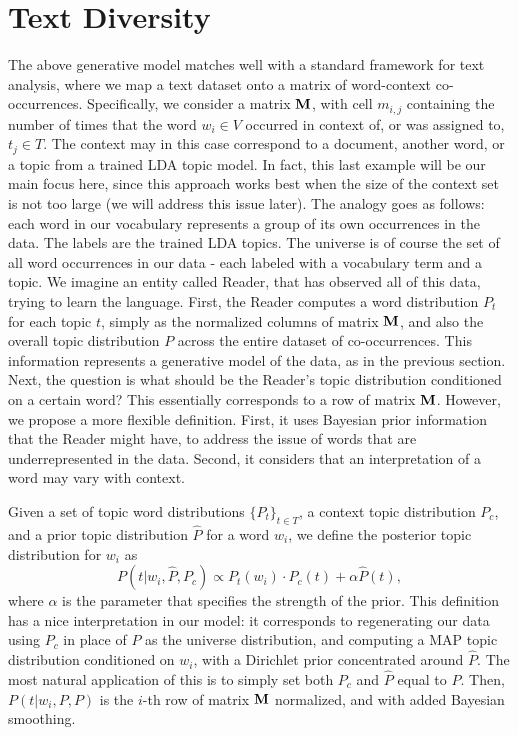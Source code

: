 \documentclass{article} %
\begin{document}
\section{Text Diversity}
\label{sec:text-diversity}
The above generative model matches well with a standard framework for
text analysis, where we map a text dataset onto a matrix of
word-context co-occurrences. Specifically, we consider a matrix $\operatorname{\mathbf{M}}$,
with cell $m_{i,j}$ containing the number of times that the word $w_i\in V$ 
occurred in context of, or was assigned to, $t_j\in T$. The context may
in this case correspond to a document, another word, or a topic
from a trained LDA topic model. In fact, this last example will be our main
focus here, since this approach works best when the size of the
context set is not too large (we will address this issue later). The
analogy goes as follows: each word in our vocabulary 
represents a group of its own occurrences in the data. The labels are
the trained LDA topics. The universe
is of course the set of all word occurrences in our data - each
labeled with a vocabulary term and a topic. We imagine an entity
called Reader, that has observed all of this data, trying to learn the
language. First, the Reader computes a word distribution $P_t$ for each
topic $t$, simply as the normalized columns of matrix $\operatorname{\mathbf{M}}$, and also
the overall topic distribution $P$ across the entire dataset of 
co-occurrences. This information represents a generative model of the
data, as in the previous section. Next, the question is what should be
the Reader's topic distribution conditioned on a certain word? This
essentially corresponds to a row of matrix $\operatorname{\mathbf{M}}$. However, we propose
a more flexible definition. First, it uses Bayesian prior
information that the Reader might have, to address the issue of words
that are underrepresented in the data. Second, it considers that an
interpretation of a word may vary with context.

\bed
Given a set of topic word distributions $\{P_t\}_{t\in T}$, a context topic
distribution $P_c$, and a prior topic distribution $\widehat{P}$ for a word $w_i$,
we define the posterior topic distribution for $w_i$ as
\[P(t|w_i,\widehat{P},P_c) \propto P_t(w_i)\cdot P_c(t) + \alpha
\widehat{P}(t),\]
where $\alpha$ is the parameter that specifies the strength of the prior.
\eed
This definition has a nice interpretation in our model: it corresponds
to regenerating our data using $P_c$ in place of $P$ as the
universe distribution, and computing a MAP topic distribution
conditioned on $w_i$, with a Dirichlet prior concentrated around
$\widehat{P}$. The most natural application of this is to simply set
both $P_c$ and $\widehat{P}$ equal to $P$. Then, $P(t|w_i,P,P)$ is the
$i$-th row of matrix $\operatorname{\mathbf{M}}$ normalized, and with added Bayesian
smoothing. 
\end{document}

